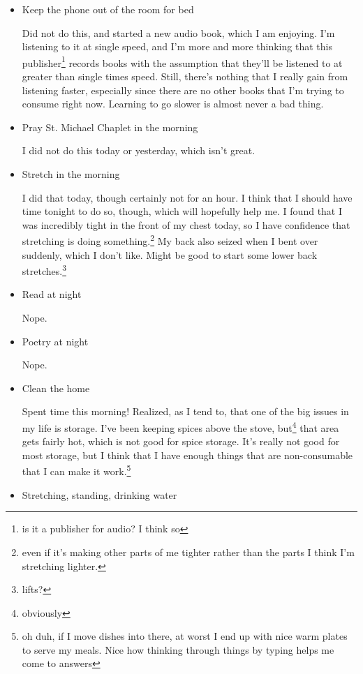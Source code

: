 \documentclass[12pt]{article}
\renewcommand{\,}{\textsuperscript{,}}
\begin{document}
\begin{itemize}
\begin{itemize}
\begin{itemize}
\item Keep the phone out of the room for bed

Did not do this, and started a new audio book, which I am enjoying.  
I'm listening to it at single speed, and I'm more and more thinking that this publisher\footnote{is it a publisher for audio? I think so} records books with the assumption that they'll be listened to at greater than single times speed.  
Still, there's nothing that I really gain from listening faster, especially since there are no other books that I'm trying to consume right now.  
Learning to go slower is almost never a bad thing.

\item Pray St. Michael Chaplet in the morning

I did not do this today or yesterday, which isn't great.

\item Stretch in the morning

I did that today, though certainly not for an hour.  
I think that I should have time tonight to do so, though, which will hopefully help me.  
I found that I was incredibly tight in the front of my chest today, so I have confidence that stretching is doing something.\footnote{even if it's making other parts of me tighter rather than the parts I think I'm stretching lighter.}  
My back also seized when I bent over suddenly, which I don't like.  
Might be good to start some lower back stretches.\footnote{lifts?}

\item Read at night

Nope.

\item Poetry at night

Nope.

\item Clean the home

Spent time this morning! Realized, as I tend to, that one of the big issues in my life is storage.  
I've been keeping spices above the stove, but\footnote{obviously} that area gets fairly hot, which is not good for spice storage.  
It's really not good for most storage, but I think that I have enough things that are non-consumable that I can make it work.\footnote{oh duh, if I move dishes into there, at worst I end up with nice warm plates to serve my meals. Nice how thinking through things by typing helps me come to answers}

\item Stretching, standing, drinking water


\end{itemize}
\end{itemize}
\end{itemize}
\end{document}

